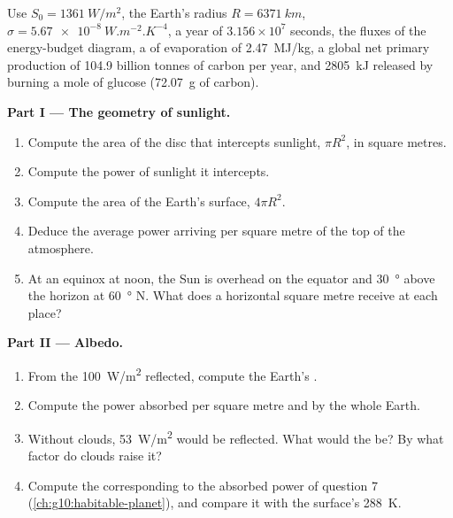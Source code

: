 \begin{problem}
\label{pb:g10:earth-energy-budget:1}
Use $S_0 = \qty{1361}{W/m^2}$, the Earth's radius $R = \qty{6371}{km}$,
$\sigma = \qty{5.67e-8}{W.m^{-2}.K^{-4}}$, a year of $3.156\times10^7$
seconds, the fluxes of the energy-budget diagram, a  of evaporation of \qty{2.47}{MJ/kg}, a global net primary production of
\num{104.9} billion tonnes of carbon per year, and \qty{2805}{kJ} released
by burning a mole of glucose (\qty{72.07}{g} of carbon).

\medskip
\noindent\textbf{Part I --- The geometry of sunlight.}
\begin{enumerate}
  \item Compute the area of the disc that intercepts sunlight, $\pi R^2$, in
        square metres.
  \item Compute the power of sunlight it intercepts.
  \item Compute the area of the Earth's surface, $4\pi R^2$.
  \item Deduce the average power arriving per square metre of the top of the
        atmosphere.
  \item At an equinox at noon, the Sun is overhead on the equator and
        \qty{30}{\degree} above the horizon at \qty{60}{\degree} N. What does
        a horizontal square metre receive at each place?
\end{enumerate}

\medskip
\noindent\textbf{Part II --- Albedo.}
\begin{enumerate}[resume]
  \item From the \qty{100}{W/m^2} reflected, compute the Earth's .
  \item Compute the power absorbed per square metre and by the whole Earth.
  \item Without clouds, \qty{53}{W/m^2} would be reflected. What would the
         be? By what factor do clouds raise it?
  \item Compute the  corresponding to the absorbed
        power of question 7 (\cref{ch:g10:habitable-planet}), and compare it
        with the surface's \qty{288}{K}.
\end{enumerate}


\end{problem}
